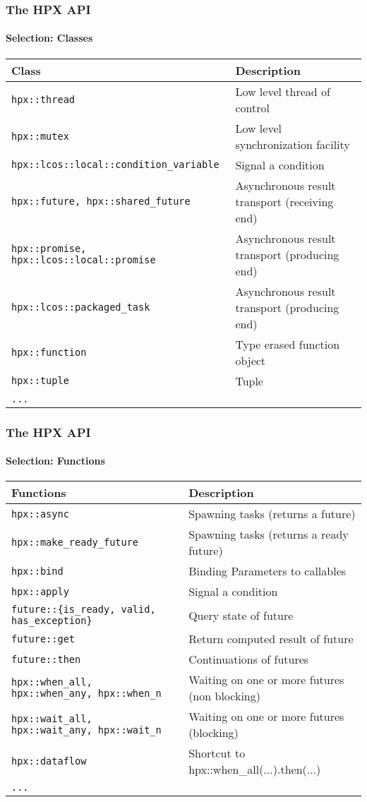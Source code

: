 \begin{frame}
\frametitle{The HPX API}
\framesubtitle{Selection: Classes}
\begin{center}
\begin{tabular}{ |l|l| } 
 \hline
 Class & Description \\
 \hline
 \texttt{hpx::thread} & Low level thread of control \\
 \texttt{hpx::mutex} & Low level synchronization facility \\
 \texttt{hpx::lcos::local::condition\_variable} & Signal a condition \\
 \texttt{hpx::future, hpx::shared\_future} & Asynchronous result transport (receiving end) \\
 \texttt{hpx::promise, hpx::lcos::local::promise} & Asynchronous result transport (producing end) \\
 \texttt{hpx::lcos::packaged\_task} & Asynchronous result transport (producing end) \\
 \texttt{hpx::function} & Type erased function object \\
 \texttt{hpx::tuple} & Tuple \\
 \texttt{...} &  \\
 \hline
\end{tabular}
\end{center}
\end{frame}

\begin{frame}
\frametitle{The HPX API}
\framesubtitle{Selection: Functions}
\begin{center}
\begin{tabular}{ |l|l| }
 \hline
 Functions & Description \\
 \hline
 \texttt{hpx::async} & Spawning tasks (returns a future) \\
 \texttt{hpx::make\_ready\_future} & Spawning tasks (returns a ready future) \\
 \texttt{hpx::bind} & Binding Parameters to callables \\
 \texttt{hpx::apply} & Signal a condition \\
 \texttt{future::\{is\_ready, valid, has\_exception\}} & Query state of future \\
 \texttt{future::get} & Return computed result of future \\
 \texttt{future::then} & Continuations of futures \\
 \texttt{hpx::when\_all, hpx::when\_any, hpx::when\_n} & Waiting on one or more futures (non blocking) \\
 \texttt{hpx::wait\_all, hpx::wait\_any, hpx::wait\_n} & Waiting on one or more futures (blocking) \\
 \texttt{hpx::dataflow} & Shortcut to hpx::when\_all(...).then(...) \\
 \texttt{...} &  \\
 \hline
\end{tabular}
\end{center}
\end{frame}

